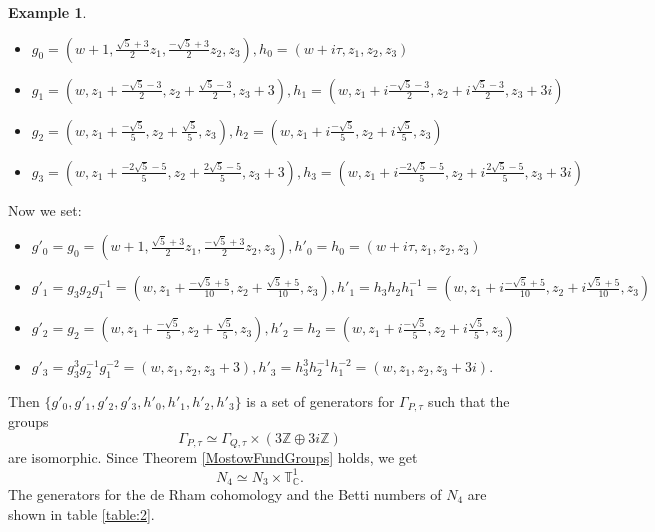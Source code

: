 \documentclass[a4paper, 11pt]{amsart}
\theoremstyle{plain}
\theoremstyle{definition}
\newtheorem{esempio}{Example}[section]
\newcommand{\C}{\mathbb{C}}
\numberwithin{equation}{section}
\begin{document}
\begin{esempio}
    \begin{itemize}
        \item 
        $g_{0} = (w+1,\frac{\sqrt{5}+3}{2}z_{1}, \frac{-\sqrt{5}+3}{2}z_{2}, z_{3} ), h_{0} = (w+i\tau,z_{1}, z_{2}, z_{3} )$\\
        \item $g_{1} = (w,z_{1}+\frac{-\sqrt{5}-3}{2}, z_{2}+\frac{\sqrt{5}-3}{2}, z_{3}+3 ), h_{1} = (w,z_{1}+i\frac{-\sqrt{5}-3}{2}, z_{2}+i\frac{\sqrt{5}-3}{2}, z_{3}+3i )$\\
        \item $g_{2} = (w,z_{1}+\frac{-\sqrt{5}}{5}, z_{2}+\frac{\sqrt{5}}{5}, z_{3} ), h_{2} = (w,z_{1}+i\frac{-\sqrt{5}}{5}, z_{2}+i\frac{\sqrt{5}}{5}, z_{3} )$ \\
        \item $g_{3} = (w,z_{1}+\frac{-2\sqrt{5}-5}{5} , z_{2}+\frac{2\sqrt{5}-5}{5} , z_{3}+3 ), h_{3} = (w,z_{1}+i\frac{-2\sqrt{5}-5}{5} , z_{2}+i\frac{2\sqrt{5}-5}{5} , z_{3}+3i )$\\
     \end{itemize}
 Now we set:
    \begin{itemize}
        \item $g'_{0} = g_{0} = (w+1,\frac{\sqrt{5}+3}{2}z_{1}, \frac{-\sqrt{5}+3}{2}z_{2}, z_{3} ), h'_{0} = h_{0} = (w+i\tau,z_{1}, z_{2}, z_{3} )$ \\
        \item $g'_{1} = g_{3}g_{2}g_{1}^{-1} = (w,z_{1}+\frac{-\sqrt{5}+5}{10}, z_{2}+\frac{\sqrt{5}+5}{10}, z_{3}), h'_{1} = h_{3}h_{2}h_{1}^{-1} = (w,z_{1}+i\frac{-\sqrt{5}+5}{10}, z_{2}+i\frac{\sqrt{5}+5}{10}, z_{3})$\\
        \item $g'_{2} = g_{2} = (w,z_{1}+\frac{-\sqrt{5}}{5}, z_{2}+\frac{\sqrt{5}}{5}, z_{3} ), h'_{2} = h_{2} = (w,z_{1}+i\frac{-\sqrt{5}}{5}, z_{2}+i\frac{\sqrt{5}}{5}, z_{3} )$ \\
        \item $g'_{3} = g_{3}^{3}g_{2}^{-1}g_{1}^{-2} = (w,z_{1} , z_{2} , z_{3}+3 ), h'_{3} = h_{3}^{3}h_{2}^{-1}h_{1}^{-2}= (w,z_{1} , z_{2} , z_{3}+3i ).$\\
    \end{itemize}
    Then $\{g'_{0}, g'_{1}, g'_{2}, g'_{3}, h'_{0}, h'_{1}, h'_{2}, h'_{3}\}$ is a set of generators for $\Gamma_{P, \tau}$ such that the groups $$\Gamma_{P, \tau} \simeq \Gamma_{Q, \tau} \times (3\mathbb{Z} \oplus 3i\mathbb{Z})$$ are isomorphic. Since Theorem \ref{MostowFundGroups} holds, we get 
    \[N_{4} \simeq N_{3} \times \mathbb{T}_{\C}^{1}.\]
The generators for the de Rham cohomology and the Betti numbers of $N_{4}$ are shown in table \ref{table:2}.
\end{esempio}
\end{document}
